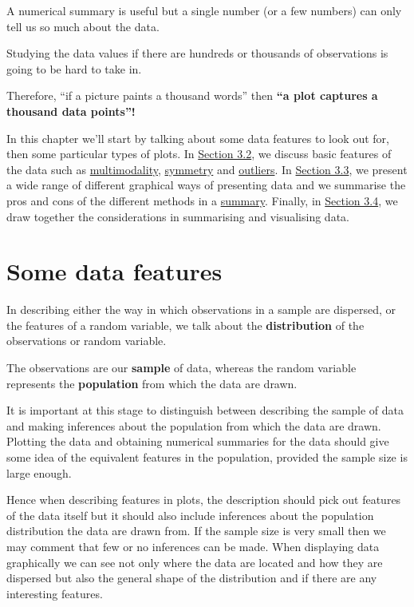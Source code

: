 \documentclass[
]{book}
\begin{document}
A numerical summary is useful but a single number (or a few numbers) can only tell us so much about the data.

Studying the data values if there are hundreds or thousands of observations is going to be hard to take in.

Therefore, ``if a picture paints a thousand words'' then \textbf{``a plot captures a thousand data points''!}

In this chapter we'll start by talking about some data features to look out for,
then some particular types of plots. In \protect\hyperlink{visual_data-features}{Section 3.2}, we discuss basic features of the data such as \protect\hyperlink{visual_data-features_multi}{multimodality}, \protect\hyperlink{visual_data-features_symmetry}{symmetry} and \protect\hyperlink{visual_data-features_outliers}{outliers}. In \protect\hyperlink{visual_plot}{Section 3.3}, we present a wide range of different graphical ways of presenting data and we summarise the pros and cons of the different methods in a \protect\hyperlink{visual_plot_summary}{summary}. Finally, in \protect\hyperlink{visual_data}{Section 3.4}, we draw together the considerations in summarising and visualising data.

\hypertarget{visual_data-features}{%
\section{Some data features}\label{visual_data-features}}

In describing either the way in which observations in a sample are
dispersed, or the features of a random variable, we talk about the
\textbf{distribution} of the observations or random variable.

The observations are our \textbf{sample} of data, whereas the random variable
represents the \textbf{population} from which the data are drawn.

It is important
at this stage to distinguish between describing the sample of data and making
inferences about the population from which the data are drawn.
Plotting
the data and obtaining numerical summaries for the data should give some
idea of the equivalent features in the population, provided the sample
size is large enough.

Hence when describing features in plots, the description should pick out
features of the data itself but it should also include inferences about
the population distribution the data are drawn from. If the sample size
is very small then we may comment that few or no inferences can be made.
When displaying data graphically we can see not only where the data are
located and how they are dispersed but also the general shape of the
distribution and if there are any interesting features.
\end{document}
